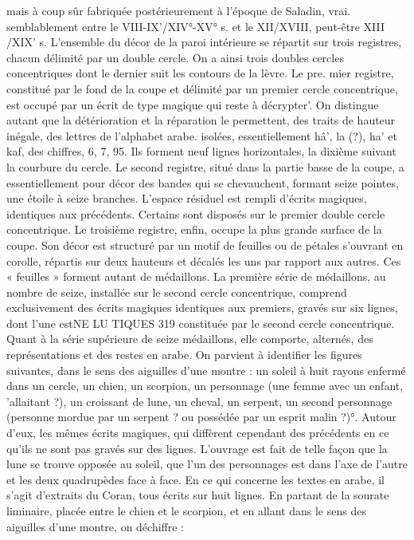 mais à coup sûr fabriquée postérieurement à l'époque de Saladin, vrai. semblablement entre le VIII-IX'/XIV°-XV° s. et le XII/XVIII, peut-être
XIII /XIX' s.
L'ensemble du décor de la paroi intérieure se répartit sur trois registres, chacun délimité par un double cercle. On a ainsi trois doubles cercles concentriques dont le dernier suit les contours de la lèvre. Le pre. mier registre, constitué par le fond de la coupe et délimité par un premier cercle concentrique, est occupé par un écrit de type magique qui reste à décrypter'. On distingue autant que la détérioration et la réparation le permettent, des traits de hauteur inégale, des lettres de l'alphabet arabe. isolées, essentiellement hâ', la (?), ha' et kaf, des chiffres, 6, 7, 95. Ils forment neuf lignes horizontales, la dixième suivant la courbure du cercle. Le second registre, situé dans la partie basse de la coupe, a essentiellement pour décor des bandes qui se chevauchent, formant seize pointes, une étoile à seize branches. L'espace résiduel est rempli d'écrits magiques, identiques aux précédents. Certains sont disposés sur le premier double cercle concentrique. Le troisième registre, enfin, occupe la plus grande surface de la coupe. Son décor est structuré par un motif de feuilles ou de pétales s'ouvrant en corolle, répartis sur deux hauteurs et décalés les uns par rapport aux autres. Ces « feuilles » forment autant de médaillons. La première série de médaillons, au nombre de seize, installée sur le second cercle concentrique, comprend exclusivement des écrits magiques identiques aux premiers, gravés sur six lignes, dont l'une estNE LU TIQUES
319
constituée par le second cercle concentrique. Quant à la série supérieure de seize médaillons, elle comporte, alternés, des représentations et des restes en arabe. On parvient à identifier les figures suivantes, dans le sens des aiguilles d'une montre : un soleil à huit rayons enfermé dans un cercle, un chien, un scorpion, un personnage (une femme avec un enfant,
'allaitant ?), un croissant de lune, un cheval, un serpent, un second personnage (personne mordue par un serpent ? ou possédée par un esprit malin ?)°. Autour d'eux, les mêmes écrits magiques, qui diffèrent cependant des précédents en ce qu'ils ne sont pas gravés sur des lignes.
L'ouvrage est fait de telle façon que la lune se trouve opposée au soleil, que l'un des personnages est dans l'axe de l'autre et les deux quadrupèdes face à face. En ce qui concerne les textes en arabe, il s'agit d'extraits du Coran, tous écrits sur huit lignes. En partant de la sourate liminaire, placée entre le chien et le scorpion, et en allant dans le sens des aiguilles d'une montre, on déchiffre :

